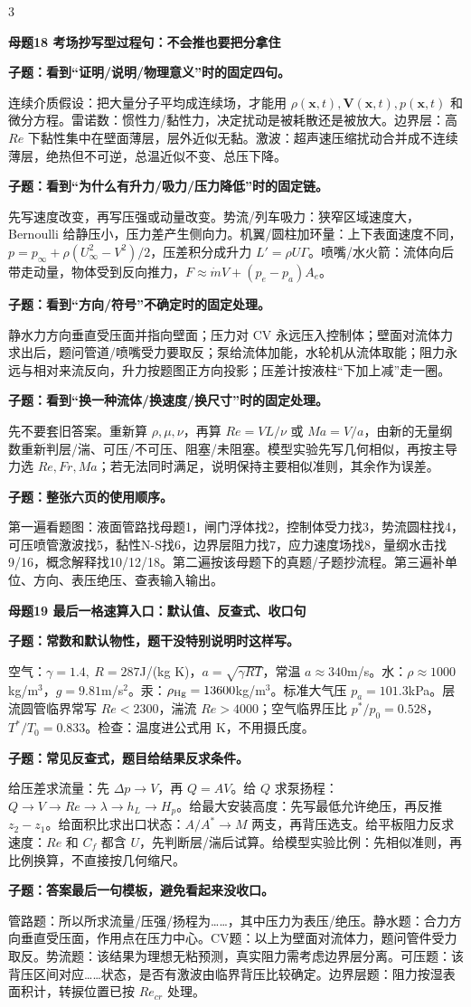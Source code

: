 \documentclass[a4paper]{article}
\newcommand{\mt}[1]{\vspace{0.45pt}\colorbox{M}{\parbox{\dimexpr\linewidth-2\fboxsep}{\color{white}\bfseries #1}}\par}
\newcommand{\qt}[1]{\vspace{0.25pt}\colorbox{Q}{\parbox{\dimexpr\linewidth-2\fboxsep}{\color{white}\bfseries #1}}\par}
\newcommand{\ans}[1]{\colorbox{G}{\parbox{\dimexpr\linewidth-2\fboxsep}{#1}}\par}
\begin{document}
\begin{multicols}{3}
\mt{母题18 考场抄写型过程句：不会推也要把分拿住}
\qt{子题：看到“证明/说明/物理意义”时的固定四句。}
\ans{连续介质假设：把大量分子平均成连续场，才能用 $\rho(\bm x,t),\bm V(\bm x,t),p(\bm x,t)$ 和微分方程。雷诺数：惯性力/黏性力，决定扰动是被耗散还是被放大。边界层：高 $Re$ 下黏性集中在壁面薄层，层外近似无黏。激波：超声速压缩扰动合并成不连续薄层，绝热但不可逆，总温近似不变、总压下降。}
\qt{子题：看到“为什么有升力/吸力/压力降低”时的固定链。}
\ans{先写速度改变，再写压强或动量改变。势流/列车吸力：狭窄区域速度大，Bernoulli 给静压小，压力差产生侧向力。机翼/圆柱加环量：上下表面速度不同，$p=p_\infty+\rho(U_\infty^2-V^2)/2$，压差积分成升力 $L'=\rho U\Gamma$。喷嘴/水火箭：流体向后带走动量，物体受到反向推力，$F\approx\dot mV+(p_e-p_a)A_e$。}
\qt{子题：看到“方向/符号”不确定时的固定处理。}
\ans{静水力方向垂直受压面并指向壁面；压力对 CV 永远压入控制体；壁面对流体力求出后，题问管道/喷嘴受力要取反；泵给流体加能，水轮机从流体取能；阻力永远与相对来流反向，升力按题图正方向投影；压差计按液柱“下加上减”走一圈。}
\qt{子题：看到“换一种流体/换速度/换尺寸”时的固定处理。}
\ans{先不要套旧答案。重新算 $\rho,\mu,\nu$，再算 $Re=VL/\nu$ 或 $Ma=V/a$，由新的无量纲数重新判层/湍、可压/不可压、阻塞/未阻塞。模型实验先写几何相似，再按主导力选 $Re,Fr,Ma$；若无法同时满足，说明保持主要相似准则，其余作为误差。}
\qt{子题：整张六页的使用顺序。}
\ans{第一遍看题图：液面管路找母题1，闸门浮体找2，控制体受力找3，势流圆柱找4，可压喷管激波找5，黏性N-S找6，边界层阻力找7，应力速度场找8，量纲水击找9/16，概念解释找10/12/18。第二遍按该母题下的真题/子题抄流程。第三遍补单位、方向、表压绝压、查表输入输出。}

\mt{母题19 最后一格速算入口：默认值、反查式、收口句}
\qt{子题：常数和默认物性，题干没特别说明时这样写。}
\ans{空气：$\gamma=1.4,\ R=287$J/(kg K)，$a=\sqrt{\gamma RT}$，常温 $a\approx340$m/s。水：$\rho\approx1000$kg/m$^3$，$g=9.81$m/s$^2$。汞：$\rho_{\rm Hg}=13600$kg/m$^3$。标准大气压 $p_a=101.3$kPa。层流圆管临界常写 $Re<2300$，湍流 $Re>4000$；空气临界压比 $p^*/p_0=0.528$，$T^*/T_0=0.833$。检查：温度进公式用 K，不用摄氏度。}
\qt{子题：常见反查式，题目给结果反求条件。}
\ans{给压差求流量：先 $\Delta p\to V$，再 $Q=AV$。给 $Q$ 求泵扬程：$Q\to V\to Re\to\lambda\to h_L\to H_p$。给最大安装高度：先写最低允许绝压，再反推 $z_2-z_1$。给面积比求出口状态：$A/A^*\to M$ 两支，再背压选支。给平板阻力反求速度：$Re$ 和 $C_f$ 都含 $U$，先判断层/湍后试算。给模型实验比例：先相似准则，再比例换算，不直接按几何缩尺。}
\qt{子题：答案最后一句模板，避免看起来没收口。}
\ans{管路题：所以所求流量/压强/扬程为……，其中压力为表压/绝压。静水题：合力方向垂直受压面，作用点在压力中心。CV题：以上为壁面对流体力，题问管件受力取反。势流题：该结果为理想无粘预测，真实阻力需考虑边界层分离。可压题：该背压区间对应……状态，是否有激波由临界背压比较确定。边界层题：阻力按湿表面积计，转捩位置已按 $Re_{cr}$ 处理。}
\end{multicols}
\end{document}
